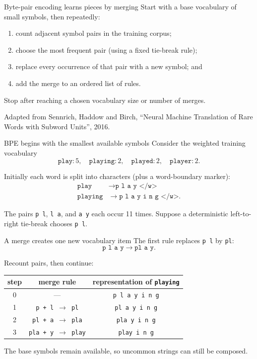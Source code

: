 \begin{frame}{Byte-pair encoding learns pieces by merging}
  Start with a base vocabulary of small symbols, then repeatedly:
  \begin{enumerate}
    \item count adjacent symbol pairs in the training corpus;
    \item choose the most frequent pair (using a fixed tie-break rule);
    \item replace every occurrence of that pair with a new symbol; and
    \item add the merge to an ordered list of rules.
  \end{enumerate}

  Stop after reaching a chosen vocabulary size or number of merges.

  \vfill
  {\tiny Adapted from Sennrich, Haddow and Birch, ``Neural Machine Translation
  of Rare Words with Subword Units'', 2016.}
\end{frame}

\begin{frame}{BPE begins with the smallest available symbols}
  Consider the weighted training vocabulary
  \[
    \texttt{play}\!:\!5,\quad
    \texttt{playing}\!:\!2,\quad
    \texttt{played}\!:\!2,\quad
    \texttt{player}\!:\!2.
  \]

  Initially each word is split into characters (plus a word-boundary marker):
  \begin{align*}
    \texttt{play} &\rightarrow \texttt{p l a y </w>} \\
    \texttt{playing} &\rightarrow \texttt{p l a y i n g </w>}.
  \end{align*}

  The pairs \texttt{p l}, \texttt{l a}, and \texttt{a y} each occur 11 times.
  Suppose a deterministic left-to-right tie-break chooses \texttt{p l}.
\end{frame}

\begin{frame}{A merge creates one new vocabulary item}
  The first rule replaces \texttt{p l} by \texttt{pl}:
  \[
    \texttt{p l a y} \longrightarrow \texttt{pl a y}.
  \]

  Recount pairs, then continue:
  \begin{center}
    \begin{tabular}{c|c|c}
      step & merge rule & representation of \texttt{playing} \\ \hline
      0 & --- & \texttt{p l a y i n g} \\
      1 & \texttt{p + l $\rightarrow$ pl} & \texttt{pl a y i n g} \\
      2 & \texttt{pl + a $\rightarrow$ pla} & \texttt{pla y i n g} \\
      3 & \texttt{pla + y $\rightarrow$ play} & \texttt{play i n g}
    \end{tabular}
  \end{center}

  The base symbols remain available, so uncommon strings can still be composed.
\end{frame}


